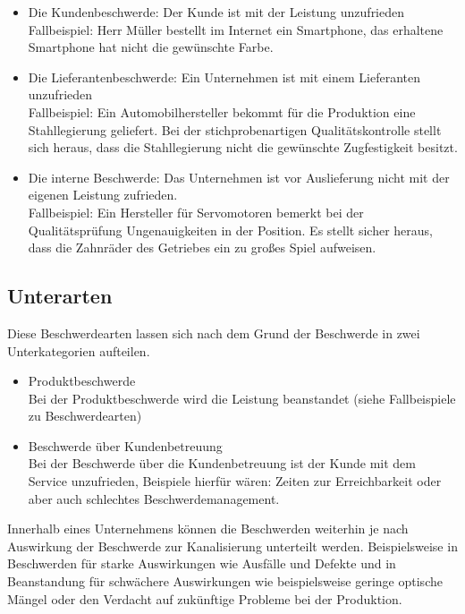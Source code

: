 \documentclass[a4paper,12pt]{article}
\begin{document}
	\begin{itemize}
		\item Die Kundenbeschwerde: Der Kunde ist mit der Leistung unzufrieden \\
		Fallbeispiel: Herr Müller bestellt im Internet ein Smartphone, das erhaltene Smartphone hat nicht die gewünschte Farbe.
		\item Die Lieferantenbeschwerde: Ein Unternehmen ist mit einem Lieferanten unzufrieden \\
		Fallbeispiel: Ein Automobilhersteller bekommt für die Produktion eine Stahllegierung geliefert. Bei der stichprobenartigen Qualitätskontrolle stellt sich heraus, dass die Stahllegierung nicht die gewünschte Zugfestigkeit besitzt.
		\item Die interne Beschwerde: Das Unternehmen ist vor Auslieferung nicht mit der eigenen Leistung zufrieden. \\
		Fallbeispiel: Ein Hersteller für Servomotoren bemerkt bei der Qualitätsprüfung Ungenauigkeiten in der Position. Es stellt sicher heraus, dass die Zahnräder des Getriebes ein zu großes Spiel aufweisen.
	\end{itemize}
	\subsection{Unterarten}
	Diese Beschwerdearten lassen sich nach dem Grund der Beschwerde in zwei Unterkategorien aufteilen.
	\begin{itemize}
		\item Produktbeschwerde \\
		Bei der Produktbeschwerde wird die Leistung beanstandet (siehe Fallbeispiele zu Beschwerdearten)
		\item Beschwerde über Kundenbetreuung \\
		Bei der Beschwerde über die Kundenbetreuung ist der Kunde mit dem Service unzufrieden, Beispiele hierfür wären: Zeiten zur Erreichbarkeit oder aber auch schlechtes Beschwerdemanagement.
	\end{itemize}
	Innerhalb eines Unternehmens können die Beschwerden weiterhin je nach Auswirkung der Beschwerde zur Kanalisierung unterteilt werden.
	Beispielsweise in Beschwerden für starke Auswirkungen wie Ausfälle und Defekte und in Beanstandung für schwächere Auswirkungen wie beispielsweise geringe optische Mängel oder den Verdacht auf zukünftige Probleme bei der Produktion.
\end{document}
